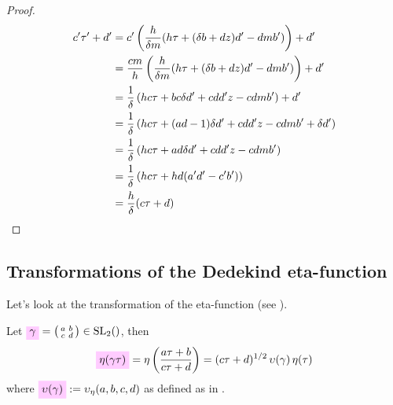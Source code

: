\documentclass{article}
\begin{document}
\begin{proof}
\begin{align*}
  c'\tau'+d'
  &=
  c'
    \left(
    \frac{h}{\delta m}(h\tau + (\delta b + d z) d' - d m b')
    \right) + d'\\
  &=
    \frac{c m}{h}
    \left(
    \frac{h}{\delta m}(h \tau + (\delta b + d z) d' - d m b')
    \right) + d'\\
  &=
    \frac{1}{\delta}
    \left(
    h c \tau + b c \delta d' + c d d' z - c d m b'
    \right) + d'\\
  &=
    \frac{1}{\delta}
    \left(
    h c \tau + (a d - 1) \delta d' + c d d' z - c d m b'
    + \delta d'
    \right)\\
  &=
    \frac{1}{\delta}
    \left(
    h c \tau + a d \delta d' + c d d' z - c d m b'
    \right)\\
  &=
    \frac{1}{\delta}
    \left(
    h c \tau + h d (a' d' - c' b')
    \right)\\
  &=
    \frac{h}{\delta} (c\tau + d)
\end{align*}
\end{proof}
\endgroup



\subsection{Transformations of the Dedekind eta-function}


Let's look at the transformation of the eta-function (see
\cite[Lemma~2.27]{Radu_PhD_2010}).

Let
$\defineNotation[gamma]{\gamma} =
\left(\begin{smallmatrix}a&b\\c&d\end{smallmatrix}\right) \in
\SL2Z$, then
\begin{gather}
\defineNotation[eta]{\eta(\gamma\tau)} =
\eta\left(\frac{a\tau+b}{c\tau+d}\right) =
(c\tau+d)^{1/2}\,\upsilon(\gamma)\,\eta(\tau)
\label{eq:eta-transformation}
\end{gather}
where
$\defineNotation[upsilon-gamma]{\upsilon(\gamma)} :=
\upsilon_\eta(a,b,c,d)$ as defined as in
\cite[Lemma~2.27]{Radu_PhD_2010}.
\end{document}
